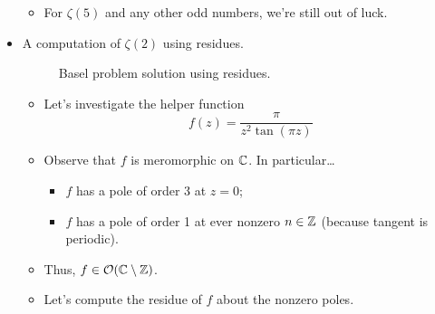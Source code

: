 \documentclass[../notes.tex]{subfiles}
\begin{document}
\begin{itemize}
\begin{itemize}
\begin{itemize}
        \end{itemize}
        \item For $\zeta(5)$ and any other odd numbers, we're still out of luck.
    \end{itemize}
    \item A computation of $\zeta(2)$ using residues.
    \begin{figure}[h!]
        \centering
        \caption{Basel problem solution using residues.}
        \label{fig:baselResidue}
    \end{figure}
    \begin{itemize}
        \item Let's investigate the helper function
        \begin{equation*}
            f(z) = \frac{\pi}{z^2\tan(\pi z)}
        \end{equation*}
        \item Observe that $f$ is meromorphic on $\mathbb{C}$. In particular\dots
        \begin{itemize}
            \item $f$ has a pole of order 3 at $z=0$;
            \item $f$ has a pole of order 1 at ever nonzero $n\in\mathbb{Z}$ (because tangent is periodic).
        \end{itemize}
        \item Thus, $f\in\mathcal{O}(\mathbb{C}\setminus\mathbb{Z})$.
        \item Let's compute the residue of $f$ about the nonzero poles.

\end{itemize}
\end{itemize}
\end{document}
